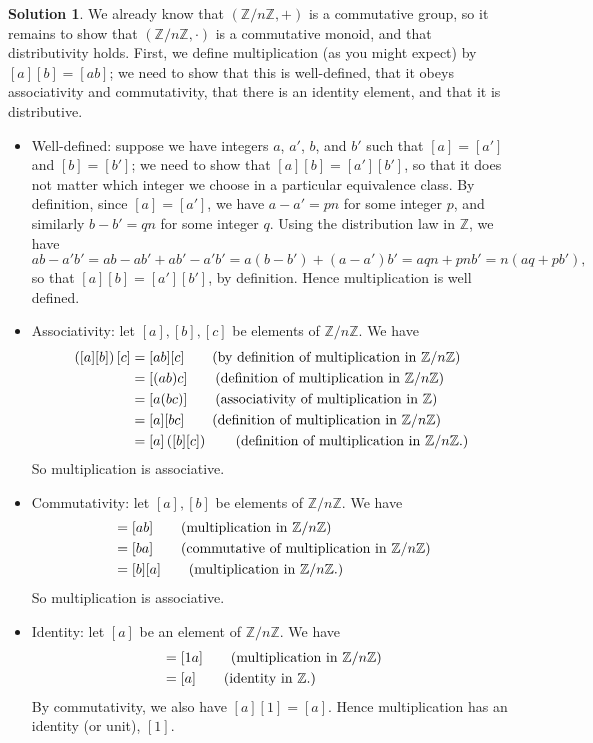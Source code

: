 \documentclass[12pt]{article}
\theoremstyle{definition}
\theoremstyle{definition}
\newtheorem*{soln}{Solution}
\newcommand{\Z}{\mathbb{Z}}
\begin{document}
\begin{soln}
We already know that $(\Z/n\Z,+)$ is a commutative group, so it remains to show that $(\Z/n\Z,\cdot)$ is a commutative monoid, and that distributivity holds. First, we define multiplication (as you might expect) by $[a][b]=[ab]$; we need to show that this is well-defined, that it obeys associativity and commutativity, that there is an identity element, and that it is distributive.
\begin{itemize}
\item Well-defined: suppose we have integers $a$, $a'$, $b$, and $b'$ such that $[a]=[a']$ and $[b]=[b']$; we need to show that $[a][b]=[a'][b']$, so that it does not matter which integer we choose in a particular equivalence class. By definition, since $[a]=[a']$, we have $a-a'=pn$ for some integer $p$, and similarly $b-b'=qn$ for some integer $q$. Using the distribution law in $\Z$, we have
\[ab-a'b' = ab-ab'+ab'-a'b' = a(b-b')+(a-a')b' = aqn+pnb' = n(aq+pb'),\]
so that $[a][b]=[a'][b']$, by definition. Hence multiplication is well defined.

\item Associativity: let $[a],[b],[c]$ be elements of $\Z/n\Z$. We have
\begin{align*}
\left([a][b]\right) [c] &= [ab][c] \tag{by definition of multiplication in $\Z/n\Z$}\\
&= [(ab)c] \tag{definition of multiplication in $\Z/n\Z$}\\
&= [a(bc)] \tag{associativity of multiplication in $\Z$}\\
&= [a][bc] \tag{definition of multiplication in $\Z/n\Z$}\\
&= [a]\left([b][c]\right) \tag{definition of multiplication in $\Z/n\Z$.}
\end{align*}
So multiplication is associative.

\item Commutativity: let $[a], [b]$ be elements of $\Z/n\Z$. We have
\begin{align*}
[a][b] &= [ab] \tag{multiplication in $\Z/n\Z$}\\
&= [ba] \tag{commutative of multiplication in $\Z/n\Z$}\\
&= [b][a] \tag{multiplication in $\Z/n\Z$.}
\end{align*}
So multiplication is associative.

\item Identity: let $[a]$ be an element of $\Z/n\Z$. We have
\begin{align*}
[1][a] &= [1a] \tag{multiplication in $\Z/n\Z$}\\
&= [a] \tag{identity in $\Z$.}
\end{align*}
By commutativity, we also have $[a][1]=[a]$. Hence multiplication has an identity (or unit), $[1]$.


\end{itemize}
\end{soln}
\end{document}
